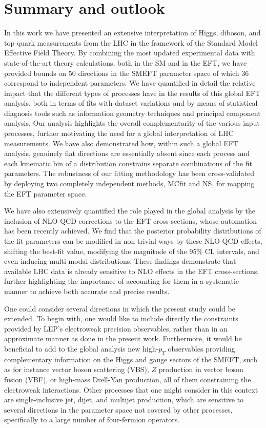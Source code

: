 \section{Summary and outlook}
\label{sec:summary}

In this work we have presented an extensive interpretation of Higgs, diboson, and top
quark measurements from the LHC in the framework of the Standard Model Effective Field Theory.
%
By combining the most updated  experimental data with state-of-the-art theory calculations,
both in the SM and in the EFT,
we have provided bounds on 50 directions in the SMEFT parameter space
of which 36 correspond to independent parameters.
%
We have quantified in detail
the relative impact that the different types of processes have in the results
of this global EFT analysis, both in terms of fits with dataset variations
and by means of statistical diagnosis tools such as information geometry techniques
and principal component analysis.
%
Our analysis 
highlights the overall complementarity of the various input processes,
further motivating the need
for a global interpretation of LHC measurements.
%
We have also demonstrated how, within such
a global EFT analysis, genuinely flat directions are essentially
absent since each process and each kinematic bin of a distribution
constrains separate combinations of the fit parameters.
%
The robustness  of our fitting methodology has been cross-validated by deploying
two completely independent methods, MCfit and NS, for mapping the EFT parameter space.

We have also extensively quantified the role played in the global analysis
by the inclusion of NLO QCD corrections to the EFT cross-sections,
whose automation has been recently achieved.
%
We find that the posterior probability distributions of the fit parameters
can be modified in non-trivial ways by these NLO QCD effects, shifting the best-fit
value, modifying the magnitude of the 95\% CL intervals, and even inducing multi-modal
distributions.
%
These findings demonstrate that available LHC data is already sensitive to
NLO effects in the EFT cross-sections, further highlighting the
importance of accounting for them in a systematic manner to achieve both
accurate and precise results.

One could consider several directions in which the present study could be extended.
%
To begin with, one would like to include directly the constraints provided
by LEP's electroweak precision observables, rather than in an 
approximate manner as done in the present work.
%
Furthermore, it would be beneficial to add to the global analysis new  high-$p_T$ observables
providing complementary information on the Higgs and gauge sectors of the SMEFT,
such as for instance vector boson scattering (VBS),  $Z$ production in vector boson fusion (VBF),
or high-mass Drell-Yan production, all of them constraining the electroweak interactions.
%
Other processes that one might consider in this context
are  single-inclusive jet, dijet,
and multijet production, which are sensitive to several directions
in the parameter space not covered by other processes, specifically to a large
number of four-fermion operators.

